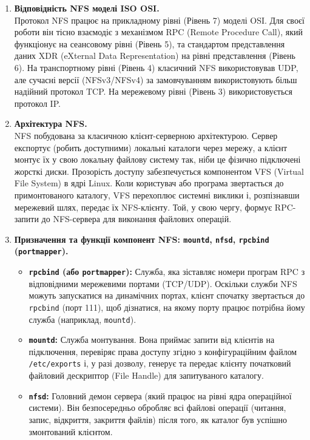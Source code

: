 \documentclass[14pt, a4paper]{extreport}
\begin{document}
	\begin{enumerate}
		\item \textbf{Відповідність NFS моделі ISO OSI.} \\ Протокол NFS працює на прикладному рівні (Рівень 7) моделі OSI. Для своєї роботи він тісно взаємодіє з механізмом RPC (Remote Procedure Call), який функціонує на сеансовому рівні (Рівень 5), та стандартом представлення даних XDR (eXternal Data Representation) на рівні представлення (Рівень 6). На транспортному рівні (Рівень 4) класичний NFS використовував UDP, але сучасні версії (NFSv3/NFSv4) за замовчуванням використовують більш надійний протокол TCP. На мережевому рівні (Рівень 3) використовується протокол IP.
		
		\item \textbf{Архітектура NFS.} \\ NFS побудована за класичною клієнт-серверною архітектурою. Сервер експортує (робить доступними) локальні каталоги через мережу, а клієнт монтує їх у свою локальну файлову систему так, ніби це фізично підключені жорсткі диски. Прозорість доступу забезпечується компонентом VFS (Virtual File System) в ядрі Linux. Коли користувач або програма звертається до примонтованого каталогу, VFS перехоплює системні виклики і, розпізнавши мережевий шлях, передає їх NFS-клієнту. Той, у свою чергу, формує RPC-запити до NFS-сервера для виконання файлових операцій.
		
		\pagebreak
		
		\item \textbf{Призначення та функції компонент NFS: \texttt{mountd}, \texttt{nfsd}, \texttt{rpcbind} (\texttt{portmapper}).} \\ \begin{itemize}
			\item \textbf{\texttt{rpcbind} (або \texttt{portmapper}):} Служба, яка зіставляє номери програм RPC з відповідними мережевими портами (TCP/UDP). Оскільки служби NFS можуть запускатися на динамічних портах, клієнт спочатку звертається до \texttt{rpcbind} (порт 111), щоб дізнатися, на якому порту працює потрібна йому служба (наприклад, \texttt{mountd}).
			\item \textbf{\texttt{mountd}:} Служба монтування. Вона приймає запити від клієнтів на підключення, перевіряє права доступу згідно з конфігураційним файлом \texttt{/etc/exports} і, у разі дозволу, генерує та передає клієнту початковий файловий дескриптор (File Handle) для запитуваного каталогу.
			\item \textbf{\texttt{nfsd}:} Головний демон сервера (який працює на рівні ядра операційної системи). Він безпосередньо обробляє всі файлові операції (читання, запис, відкриття, закриття файлів) після того, як каталог був успішно змонтований клієнтом.
		\end{itemize}
		

\end{enumerate}
\end{document}

